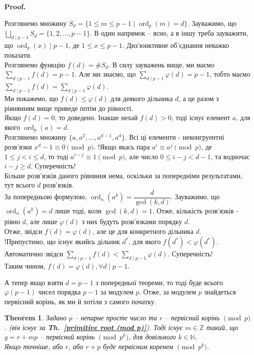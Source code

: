 \documentclass[a4paper, 14pt]{extarticle}
\makeatletter
\theoremstyle{theoremdd}
\newtheorem{theorem}{Theorem}[subsection]
\theoremstyle{theoremdd}
\theoremstyle{theoremdd}
\theoremstyle{theoremdd}
\theoremstyle{theoremdd}
\theoremstyle{theoremdd}
\theoremstyle{theoremdd}
\theoremstyle{theoremdd}
\def\qed{$\blacksquare$}
\renewenvironment{proof}[1][Proof.\\]{\par
\pushQED{\hfill \qed}%
\normalfont \topsep6\p@\@plus6\p@\relax
\trivlist
\item\relax
{\bfseries
#1\@addpunct{.}}\hspace\labelsep\ignorespaces
}{%
\popQED\endtrivlist\@endpefalse
}
\DeclareMathOperator{\ord}{ord}
\newcommand\thref[1]{\textbf{Th.~\ref{#1}}}
\makeatother
\begin{document}
\begin{proof}
Розглянемо множину $S_d = \{ 1 \leq m \leq p-1 \mid \ord_p (m) = d \}$. Зауважимо, що $\displaystyle\bigsqcup_{d \mid p-1} S_d = \{1,2,\dots,p-1\}$. В один напрямок -- ясно, а в іншу треба зауважити, що $\ord_p (x) \mid p-1$, де $1 \leq x \leq p-1$. Диз'юнктивне об'єднання неважко показати.\\
Розглянемо функцію $f(d) = \# S_d$. В силу зауважень вище, ми маємо $\displaystyle\sum_{d \mid p-1} f(d) = p-1$. Але ми знаємо, що $\displaystyle\sum_{d \mid p-1} \varphi(d) = p-1$, тобто маємо \\ $\displaystyle\sum_{d \mid p-1} f(d) = \sum_{d \mid p-1} \varphi(d)$.\\
Ми покажемо, що $f(d) \leq \varphi(d)$ для деякого дільника $d$, а це разом з рівнянням вище приведе потім до рівності.\\
Якщо $f(d) = 0$, то доведено. Інакше нехай $f(d) > 0$, тоді існує елемент $a$, для якого $\ord_p (a) = d$.\\
Розглянемо множину $\{a,a^2,\dots,a^{d-1},a^d\}$. Всі ці елементи - неконгруентні розв'язки $x^d - 1 \equiv 0 \pmod p$. !Якщо якась пара $a^i \equiv a^j \pmod p$, де $1 \leq j < i \leq d$, то тоді $a^{i-j} \equiv 1 \pmod p$, але число $0 \leq i-j < d-1$, та водночас $i-j \geq d$. Суперечність!\\
Більше розв'язків даного рівняння нема, оскільки за попередніми результатами, тут всього $d$ розв'язків.\\
За попередньою формулою, $\ord_n (a^k) = \dfrac{d}{\gcd(k,d)}$. Зауважимо, що \\
$\ord_n (a^k) = d$ лише тоді, коли $\gcd(k,d) = 1$. Отже, кількість розв'язків - рівно $d$, але лише $\varphi(d)$ з них будуть розв'язками порядку $d$.\\
Отже, звідси $f(d) = \varphi(d)$, але це для конкретного дільника $d$.\\
!Припустимо, що існує якийсь дільник $d^*$, для якого $f(d^*) < \varphi(d^*)$. Автоматично звідси $\displaystyle\sum_{d \mid p-1} f(d) < \sum_{d \mid p-1} \varphi(d)$. Суперечність!\\
Таким чином, $f(d) = \varphi(d), \forall d \mid p-1$.
\end{proof}

А тепер якщо взяти $d = p-1$ з попередньої теореми, то тоді буде всього $\varphi(p-1)$ чисел порядка $p-1$ за модулем $p$. Отже, за модулем $p$ знайдеться первісний корінь, як ми й хотіли з самого початку.

\begin{theorem}
Задано $p$ -- непарне просте число та $r$ -- первісний корінь $\pmod p$. (він існує за \thref{primitive root (mod p)}). Тоді існує $m \in \mathbb{Z}$ такий, що $g = r+mp$ -- первісний корінь $\pmod {p^k}$, для довільного $k \in \mathbb{N}$.\\
Якщо точніше, або $r$, або $r + p$ буде первісним коренем $\pmod {p^k}$.
\end{theorem}
\end{document}
